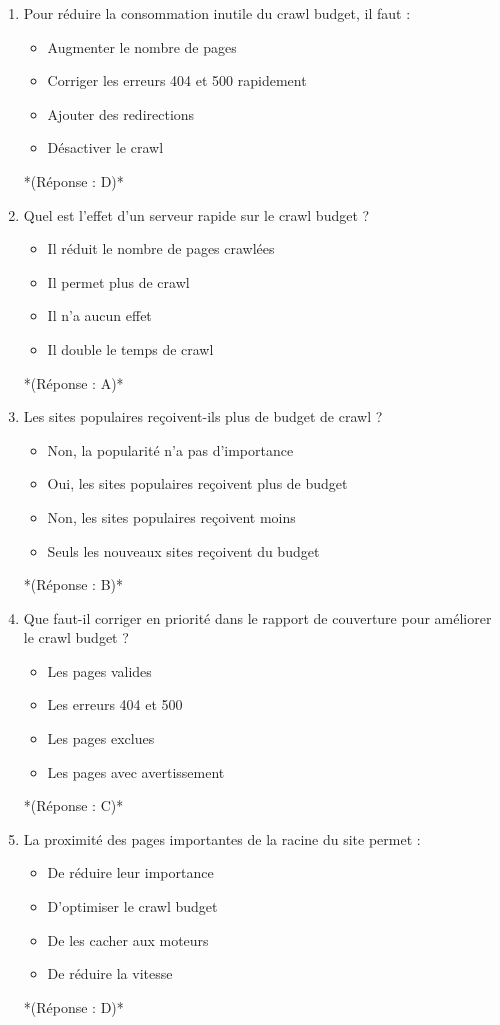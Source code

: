 \documentclass[12pt,a4paper,twoside]{report}
\begin{document}
\begin{enumerate}
\item Pour réduire la consommation inutile du crawl budget, il faut :
\begin{itemize}
\item[A)] Augmenter le nombre de pages
\item[B)] Corriger les erreurs 404 et 500 rapidement
\item[C)] Ajouter des redirections
\item[D)] Désactiver le crawl
\end{itemize}
*(Réponse : D)*

\item Quel est l'effet d'un serveur rapide sur le crawl budget ?
\begin{itemize}
\item[A)] Il réduit le nombre de pages crawlées
\item[B)] Il permet plus de crawl
\item[C)] Il n'a aucun effet
\item[D)] Il double le temps de crawl
\end{itemize}
*(Réponse : A)*

\item Les sites populaires reçoivent-ils plus de budget de crawl ?
\begin{itemize}
\item[A)] Non, la popularité n'a pas d'importance
\item[B)] Oui, les sites populaires reçoivent plus de budget
\item[C)] Non, les sites populaires reçoivent moins
\item[D)] Seuls les nouveaux sites reçoivent du budget
\end{itemize}
*(Réponse : B)*

\item Que faut-il corriger en priorité dans le rapport de couverture pour améliorer le crawl budget ?
\begin{itemize}
\item[A)] Les pages valides
\item[B)] Les erreurs 404 et 500
\item[C)] Les pages exclues
\item[D)] Les pages avec avertissement
\end{itemize}
*(Réponse : C)*

\item La proximité des pages importantes de la racine du site permet :
\begin{itemize}
\item[A)] De réduire leur importance
\item[B)] D'optimiser le crawl budget
\item[C)] De les cacher aux moteurs
\item[D)] De réduire la vitesse
\end{itemize}
*(Réponse : D)*


\end{enumerate}
\end{document}
